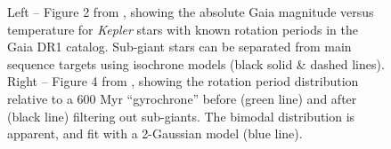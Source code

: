 \documentclass[12pt]{article}
\newcommand{\Kepler}{\textsl{Kepler}\xspace}
\begin{document}
\begin{figure}[!th]
\centering
{}
\caption{Left -- Figure 2 from \citet{davenport2017}, showing the absolute Gaia magnitude versus temperature for \Kepler stars with known rotation periods in the Gaia DR1 catalog. Sub-giant stars can be separated from main sequence targets using isochrone models (black solid \& dashed lines). Right -- Figure 4 from \citet{davenport2017}, showing the rotation period distribution relative to a 600 Myr ``gyrochrone'' before (green line) and after (black line) filtering out sub-giants. The bimodal distribution is apparent, and fit with a 2-Gaussian model (blue line).}
\label{fig:cmd}
\end{figure}
\end{document}
